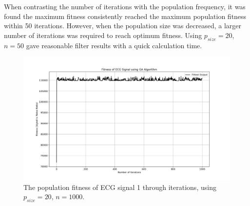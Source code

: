 \documentclass[a4paper, 11pt]{article}
\begin{document}
    When contrasting the number of iterations with the population frequency, it was found the maximum fitness consistently reached 
    the maximum population fitness within 50 iterations. However, when the population size was decreased, a larger number of
    iterations was required to reach optimum fitness. Using $p_{size} = 20$, $n = 50$ gave reasonable filter results with a
    quick calculation time.

    \begin{figure}[h!]
        \centering
        \graphicspath{{./wiki/}}
        \includegraphics[scale=0.5]{1kGen20Pop.png}
        \caption{The population fitness of ECG signal 1 through iterations, using $p_{size} = 20$, $n = 1000$.}
        \label{Fig:result_2}
    \end{figure}
\end{document}
